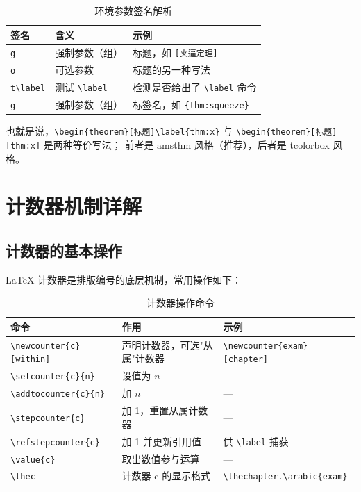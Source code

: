 \begin{table}[htbp]
  \centering
  \caption{环境参数签名解析}\label{tab:signature}
  \begin{tabular}{llp{7.5cm}}
    \toprule
    签名 & 含义 & 示例 \\
    \midrule
    \texttt{g} & 强制参数（组）& 标题，如 \texttt{[夹逼定理]} \\
    \texttt{o} & 可选参数 & 标题的另一种写法 \\
    \texttt{t\textbackslash label} & 测试 \texttt{\textbackslash label}
      & 检测是否给出了 \texttt{\textbackslash label} 命令 \\
    \texttt{g} & 强制参数（组）& 标签名，如 \texttt{\{thm:squeeze\}} \\
    \bottomrule
  \end{tabular}
\end{table}

也就是说，\verb|\begin{theorem}[标题]\label{thm:x}| 与
\verb|\begin{theorem}[标题][thm:x]| 是两种等价写法；
前者是 amsthm 风格（推荐），后者是 tcolorbox 风格。

\section{计数器机制详解}

\subsection{计数器的基本操作}

LaTeX 计数器是排版编号的底层机制，常用操作如下：

\begin{table}[htbp]
  \centering
  \caption{计数器操作命令}\label{tab:counterops}
  \begin{tabular}{llp{6.5cm}}
    \toprule
    命令 & 作用 & 示例 \\
    \midrule
    \texttt{\textbackslash newcounter\{c\}[within]}
      & 声明计数器，可选"从属"计数器 &
      \texttt{\textbackslash newcounter\{exam\}[chapter]} \\
    \texttt{\textbackslash setcounter\{c\}\{n\}} & 设值为 $n$ & --- \\
    \texttt{\textbackslash addtocounter\{c\}\{n\}} & 加 $n$ & --- \\
    \texttt{\textbackslash stepcounter\{c\}} & 加 1，重置从属计数器 & --- \\
    \texttt{\textbackslash refstepcounter\{c\}} & 加 1 并更新引用值 &
      供 \texttt{\textbackslash label} 捕获 \\
    \texttt{\textbackslash value\{c\}} & 取出数值参与运算 & --- \\
    \texttt{\textbackslash thec} & 计数器 c 的显示格式 &
      \texttt{\textbackslash thechapter.\textbackslash arabic\{exam\}} \\
    \bottomrule
  \end{tabular}
\end{table}

